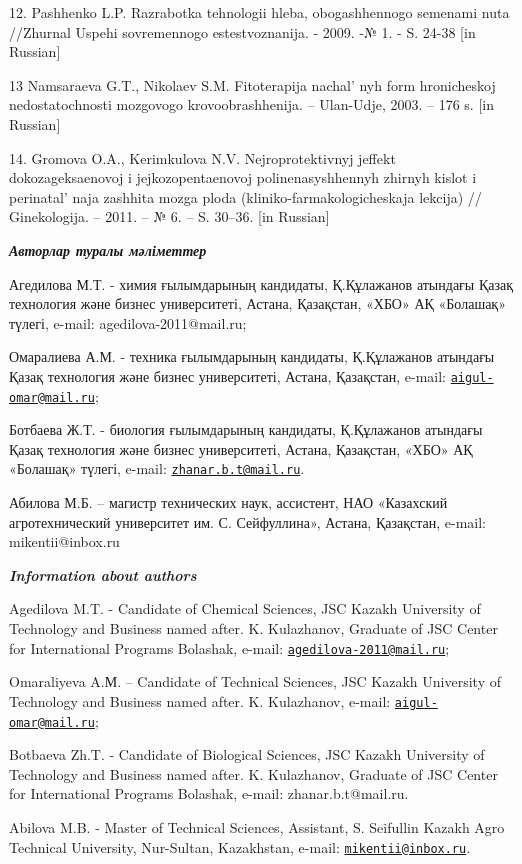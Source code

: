 12. Pashhenko L.P. Razrabotka tehnologii hleba, obogashhennogo semenami
nuta //Zhurnal Uspehi sovremennogo estestvoznanija. - 2009. -№ 1. - S.
24-38 {[}in Russian{]}

13 Namsaraeva G.T., Nikolaev S.M. Fitoterapija
nachal' nyh form hronicheskoj nedostatochnosti mozgovogo
krovoobrashhenija. -- Ulan-Udje, 2003. -- 176 s. {[}in Russian{]}

14. Gromova O.A., Kerimkulova N.V. Nejroprotektivnyj jeffekt
dokozageksaenovoj i jejkozopentaenovoj polinenasyshhennyh zhirnyh kislot
i perinatal' naja zashhita mozga ploda
(kliniko-farmakologicheskaja lekcija) // Ginekologija. -- 2011. -- № 6.
-- S. 30--36. {[}in Russian{]}

\emph{{\bfseries Авторлар туралы мәліметтер}}

Агедилова М.Т. - химия ғылымдарының кандидаты, Қ.Құлажанов атындағы
Қазақ технология және бизнес университеті, Астана, Қазақстан, «ХБО» АҚ
«Болашақ» түлегі, e-mail: agedilova-2011@mail.ru;

Омаралиева А.М. - техника ғылымдарының кандидаты, Қ.Құлажанов атындағы
Қазақ технология және бизнес университеті, Астана, Қазақстан, e-mail:
\href{mailto:aigul-omar@mail.ru}{\nolinkurl{aigul-omar@mail.ru}};

Ботбаева Ж.Т. - биология ғылымдарының кандидаты, Қ.Құлажанов атындағы
Қазақ технология және бизнес университеті, Астана, Қазақстан, «ХБО» АҚ
«Болашақ» түлегі, e-mail:
\href{mailto:zhanar.b.t@mail.ru}{\nolinkurl{zhanar.b.t@mail.ru}}.

Абилова М.Б. -- магистр технических наук, ассистент, НАО «Казахский
агротехнический университет им. С. Сейфуллина», Астана, Қазақстан,
e-mail: mikentii@inbox.ru

\emph{{\bfseries Information about authors}}

Agedilova M.T. - Candidate of Chemical Sciences, JSC Kazakh University
of Technology and Business named after. K. Kulazhanov, Graduate of JSC
Center for International Programs Bolashak, e-mail:
\href{mailto:agedilova-2011@mail.ru}{\nolinkurl{agedilova-2011@mail.ru}};

Omaraliyeva A.М. -- Candidate of Technical Sciences, JSC Kazakh
University of Technology and Business named after. K. Kulazhanov,
e-mail:
\href{mailto:aigul-omar@mail.ru}{\nolinkurl{aigul-omar@mail.ru}};

Botbaeva Zh.T. - Candidate of Biological Sciences, JSC Kazakh University
of Technology and Business named after. K. Kulazhanov, Graduate of JSC
Center for International Programs Bolashak, e-mail: zhanar.b.t@mail.ru.

Abilova M.B. - Master of Technical Sciences, Assistant, S. Seifullin
Kazakh Agro Technical University, Nur-Sultan, Kazakhstan, e-mail:
\href{mailto:mikentii@inbox.ru}{\nolinkurl{mikentii@inbox.ru}}.